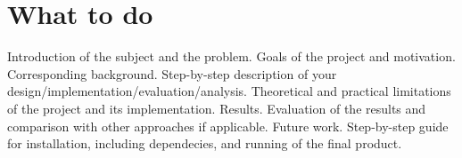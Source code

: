 \documentclass[11pt, a4paper, twoside, openright]{book} %
\begin{document}
 


\section{What to do}


Introduction of the subject and the problem.
Goals of the project and motivation.
Corresponding background.
Step-by-step description of your design/implementation/evaluation/analysis.
Theoretical and practical limitations of the project and its implementation.
Results.
Evaluation of the results and comparison with other approaches if applicable.
Future work.
Step-by-step guide for installation, including dependecies, and running of the final product.







\tableofcontents
\end{document}
